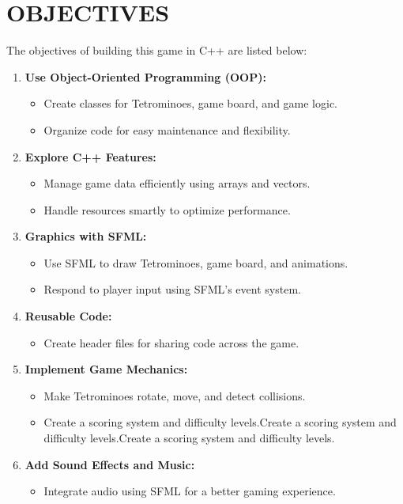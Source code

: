 \newpage
\section{OBJECTIVES}
The objectives of building this game in C++ are listed below:


\begin{enumerate}
\item \textbf{Use Object-Oriented Programming (OOP):}
	\begin{itemize}
		\item Create classes for Tetrominoes, game board, and game logic.
		\item Organize code for easy maintenance and flexibility.
	\end{itemize}
	
\item \textbf{Explore C++ Features:}
\begin{itemize}
	\item Manage game data efficiently using arrays and vectors.
	\item Handle resources smartly to optimize performance.
\end{itemize}

\item \textbf{Graphics with SFML:}
\begin{itemize}
	\item Use SFML to draw Tetrominoes, game board, and animations.
	\item Respond to player input using SFML's event system.
\end{itemize}

\item \textbf{Reusable Code:}
\begin{itemize}
	\item Create header files for sharing code across the game.
\end{itemize}

\item \textbf{Implement Game Mechanics:}
\begin{itemize}
	\item Make Tetrominoes rotate, move, and detect collisions.
	\item Create a scoring system and difficulty levels.Create a scoring system and difficulty levels.Create a scoring system and difficulty levels.
\end{itemize}

\item \textbf{Add Sound Effects and Music:}
\begin{itemize}
	\item Integrate audio using SFML for a better gaming experience.
\end{itemize}


\end{enumerate}
